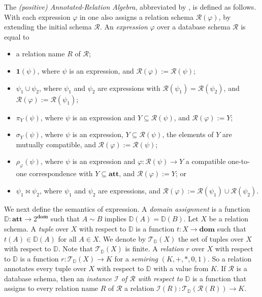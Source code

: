The \emph{(positive) Annotated-Relation Algebra}, abbreviated by \ARA, is defined as follows. With each expression $\varphi$ in \ARA one also assigns a relation schema $\mathcal{R}(\varphi)$, by extending the initial schema
$\mathcal{R}$. An \emph{\ARA expression} $\varphi$ over a database schema $\mathcal{R}$ is equal to 
\begin{itemize}
\item a relation name $R$ of $\mathcal{R}$;
\item $\mathbf{1}(\psi)$, where $\psi$ is an \ARA expression, and $\mathcal{R}(\varphi) := \mathcal{R}(\psi)$;
\item $\psi_1 \cup \psi_2$, where $\psi_1$ and $\psi_2$ are \ARA expressions with $\mathcal{R}(\psi_1) = \mathcal{R}(\psi_2)$, and $\mathcal{R}(\varphi) := \mathcal{R}(\psi_1)$;
\item $\pi_Y(\psi)$, where $\psi$ is an \ARA expression and $Y \subseteq \mathcal{R}(\psi)$, and $\mathcal{R}(\varphi) := Y$;
\item $\sigma_{Y}(\psi)$, where $\psi$ is an \ARA expression, $Y \subseteq \mathcal{R}(\psi)$, the elements of $Y$ are mutually compatible, and $\mathcal{R}(\varphi) := \mathcal{R}(\psi)$;
\item $\rho_\varphi(\psi)$, where $\psi$ is an \ARA expression and $\varphi: \mathcal{R}(\psi) \to Y$ a compatible one-to-one correspondence with $Y \subseteq \mathbf{att}$, and $\mathcal{R}(\varphi) := Y$; or
\item $\psi_1 \Join \psi_2$, where $\psi_1$ and $\psi_2$ are \ARA expressions, and $\mathcal{R}(\varphi) := \mathcal{R}(\psi_1) \cup \mathcal{R}(\psi_2)$.
\end{itemize}

We next define the semantics of \ARA expression.
A \emph{domain assignment} is a function $\mathbb{D}: \mathbf{att} \to
2^{\mathbf{dom}}$ such that $A \sim B$ implies
$\mathbb{D}(A) = \mathbb{D}(B)$. Let $X$ be a relation schema. A \emph{tuple} over
$X$ with respect to $\mathbb{D}$
is a function $t: X \to \mathbf{dom}$ such that
$t(A) \in \mathbb{D}(A)$ for all $A \in X$. We denote by
$\mathcal{T}_{\mathbb{D}}(X)$ the set of tuples over $X$ with respect to $\mathbb{D}$. Note that
$\mathcal{T}_{\mathbb{D}}(X)$ is finite.  A \emph{relation} $r$ over
$X$ with respect to $\mathbb{D}$ is a function $r:
\mathcal{T}_{\mathbb{D}}(X) \to K$ for a \emph{semiring} $(K,+,*,0,1)$. So a relation annotates every tuple
over $X$ with respect to $\mathbb{D}$ with a value from $K$.  If $\mathcal{R}$ is a
database schema, then an \emph{instance $\mathcal{I}$ of
$\mathcal{R}$ with respect to $\mathbb{D}$} is a function that assigns to every
relation name $R$ of $\mathcal{R}$ a relation $\mathcal{I}(R):
\mathcal{T}_{\mathbb{D}}(\mathcal{R}(R)) \to K$.


